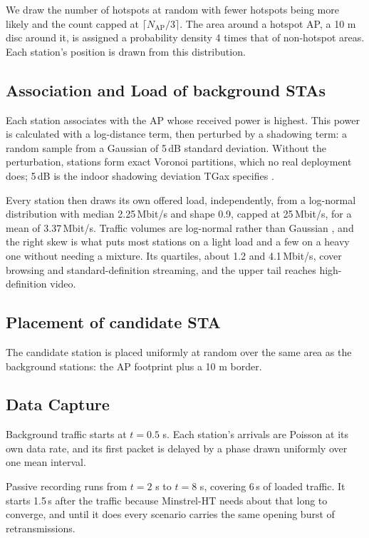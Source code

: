 \documentclass[conference]{IEEEtran}
\begin{document}
We draw the number of hotspots at random with fewer hotspots being more likely
and the count capped at $\lceil N_{\mathrm{AP}}/3\rceil$. The area around a hotspot AP,
a 10 m disc around it, is assigned a probability density 4 times that of non-hotspot 
areas. Each station's position is drawn from this distribution. 

\subsection{Association and Load of background STAs}

Each station associates with the AP whose received power is highest. This
power is calculated with a log-distance term, then perturbed by a shadowing
term: a random sample from a Gaussian of 5\,dB standard deviation. Without
the perturbation, stations form exact Voronoi partitions, which no real
deployment does; 5\,dB is the indoor shadowing deviation TGax specifies
\cite{tgax2016scenarios}. 

Every station then draws its own offered load, independently, from a log-normal
distribution with median 2.25\,Mbit/s and shape 0.9, capped at 25\,Mbit/s, for a
mean of 3.37\,Mbit/s. Traffic volumes are log-normal rather than Gaussian
\cite{lognormal2020}, and the right skew is what puts most stations on a light
load and a few on a heavy one without needing a mixture. Its quartiles, 
about 1.2 and 4.1\,Mbit/s, cover browsing and standard-definition streaming, 
and the upper tail reaches high-definition video.


\subsection{Placement of candidate STA}

The candidate station is placed uniformly at random over the same area as the
background stations: the AP footprint plus a 10 m border.

\subsection{Data Capture}

Background traffic starts at $t=0.5$ s. Each station's arrivals are Poisson at
its own data rate, and its first packet is delayed by a phase drawn uniformly
over one mean interval.

Passive recording runs from $t=2$ s to $t=8$ s, covering 6\,s of loaded
traffic. It starts 1.5\,s after the traffic because Minstrel-HT needs about that
long to converge, and until it does every scenario carries the same opening
burst of retransmissions. 
\end{document}
